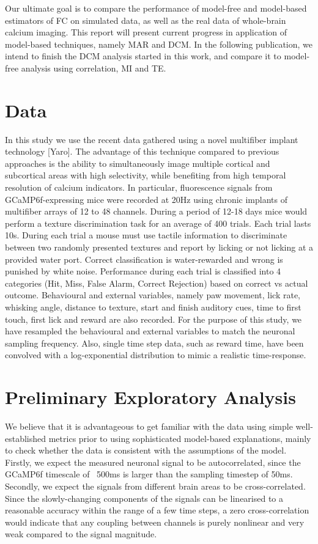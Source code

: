 \documentclass[a4paper,10pt]{article}
\begin{document}
Our ultimate goal is to compare the performance of model-free and model-based estimators of FC on simulated data, as well as the real data of whole-brain calcium imaging. This report will present current progress in application of model-based techniques, namely MAR and DCM. In the following publication, we intend to finish the DCM analysis started in this work, and compare it to model-free analysis using correlation, MI and TE.


\section{Data}
In this study we use the recent data gathered using a novel multifiber implant technology [Yaro]. The advantage of this technique compared to previous approaches is the ability to simultaneously image multiple cortical and subcortical areas with high selectivity, while benefiting from high temporal resolution of calcium indicators. In particular, fluorescence signals from GCaMP6f-expressing mice were recorded at 20Hz using chronic implants of multifiber arrays of 12 to 48 channels. During a period of 12-18 days mice would perform a texture discrimination task for an average of 400 trials. Each trial lasts 10s. During each trial a mouse must use tactile information to discriminate between two randomly presented textures and report by licking or not licking at a provided water port. Correct classification is water-rewarded and wrong is punished by white noise. Performance during each trial is classified into 4 categories (Hit, Miss, False Alarm, Correct Rejection) based on correct vs actual outcome. Behavioural and external variables, namely paw movement, lick rate, whisking angle, distance to texture, start and finish auditory cues, time to first touch, first lick and reward are also recorded. For the purpose of this study, we have resampled the behavioural and external variables to match the neuronal sampling frequency. Also, single time step data, such as reward time, have been convolved with a log-exponential distribution to mimic a realistic time-response.

\section{Preliminary Exploratory Analysis}
We believe that it is advantageous to get familiar with the data using simple well-established metrics prior to using sophisticated model-based explanations, mainly to check whether the data is consistent with the assumptions of the model. Firstly, we expect the measured neuronal signal to be autocorrelated, since the GCaMP6f timescale of ~500ms is larger than the sampling timestep of 50ms. Secondly, we expect the signals from different brain areas to be cross-correlated. Since the slowly-changing components of the signals can be linearised to a reasonable accuracy within the range of a few time steps, a zero cross-correlation would indicate that any coupling between channels is purely nonlinear and very weak compared to the signal magnitude.
\end{document}
